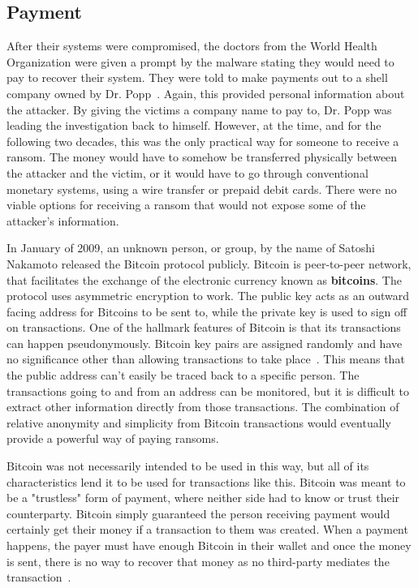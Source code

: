 \documentclass{IEEEtran}
\begin{document}
\subsection{Payment}\label{payment}
After their systems were compromised, the doctors from the World Health Organization were given a prompt by the malware stating they would need to pay to recover their system. They were told to make payments out to a shell company owned by Dr. Popp~\cite{RN40}. Again, this provided personal information about the attacker. By giving the victims a company name to pay to, Dr. Popp was leading the investigation back to himself. However, at the time, and for the following two decades, this was the only practical way for someone to receive a ransom. The money would have to somehow be transferred physically between the attacker and the victim, or it would have to go through conventional monetary systems, using a wire transfer or prepaid debit cards. There were no viable options for receiving a ransom that would not expose some of the attacker's information.

In January of 2009, an unknown person, or group, by the name of Satoshi Nakamoto released the Bitcoin protocol publicly. Bitcoin is peer-to-peer network, that facilitates the exchange of the electronic currency known as \textbf{bitcoins}. The protocol uses asymmetric encryption to work. The public key acts as an outward facing address for Bitcoins to be sent to, while the private key is used to sign off on transactions. One of the hallmark features of Bitcoin is that its transactions can happen pseudonymously. Bitcoin key pairs are assigned randomly and have no significance other than allowing transactions to take place~\cite{RN36}. This means that the public address can't easily be traced back to a specific person. The transactions going to and from an address can be monitored, but it is difficult to extract other information directly from those transactions. The combination of relative anonymity and simplicity from Bitcoin transactions would eventually provide a powerful way of paying ransoms.

Bitcoin was not necessarily intended to be used in this way, but all of its characteristics lend it to be used for transactions like this. Bitcoin was meant to be a "trustless" form of payment, where neither side had to know or trust their counterparty. Bitcoin simply guaranteed the person receiving payment would certainly get their money if a transaction to them was created. When a payment happens, the payer must have enough Bitcoin in their wallet and once the money is sent, there is no way to recover that money as no third-party mediates the transaction~\cite{RN36}.
\end{document}
